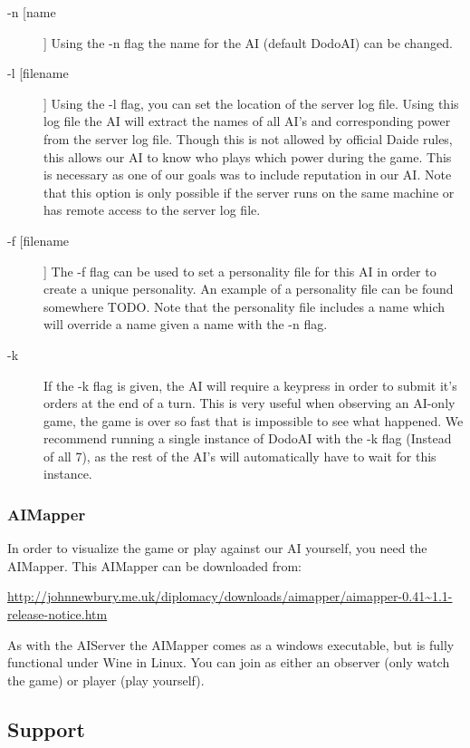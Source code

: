 \documentclass[a4paper]{article} %
\begin{document}
\begin{description}
\item[-n [name]] Using the -n flag the name for the AI (default DodoAI) can be changed. 
\item[-l [filename]] Using the -l flag, you can set the location of the server log file. Using this log file the AI will extract the names of all AI's and corresponding power from the server log file. Though this is not allowed by official Daide rules, this allows our AI to know who plays which power during the game. This is necessary as one of our goals was to include reputation in our AI. Note that this option is only possible if the server runs on the same machine or has remote access to the server log file.  
\item[-f [filename]] The -f flag can be used to set a personality file for this AI in order to create a unique personality. An example of a personality file can be found somewhere TODO. Note that the personality file includes a name which will override a name given a name with the -n flag.  %
\item[-k] If the -k flag is given, the AI will require a keypress in order to submit it's orders at the end of a turn. This is very useful when observing an AI-only game, the game is over so fast that is impossible to see what happened. We recommend running a single instance of DodoAI with the -k flag (Instead of all 7), as the rest of the AI's will automatically have to wait for this instance.  
\end{description} 

\subsubsection{AIMapper}
In order to visualize the game or play against our AI yourself, you need the AIMapper. This AIMapper can be downloaded from: 

\begin{sloppypar}
\noindent\url{http://johnnewbury.me.uk/diplomacy/downloads/aimapper/aimapper-0.41~1.1-release-notice.htm}
\end{sloppypar}

As with the AIServer the AIMapper comes as a windows executable, but is fully functional under Wine in Linux. You can join as either an observer (only watch the game) or player (play yourself). 


\subsection{Support}
\end{document}
